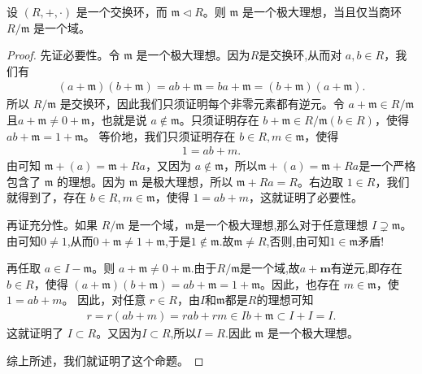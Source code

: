 \documentclass[../../main.tex]{subfiles}
\begin{document}
\begin{proposition}[极大理想的充要条件]\label{proposition:极大理想的充要条件}
设 $(R, +, \cdot)$ 是一个交换环，而 $\mathfrak{m} \lhd R$。则 $\mathfrak{m}$ 是一个极大理想，当且仅当商环 $R / \mathfrak{m}$ 是一个域。
\end{proposition}
\begin{proof}
先证必要性。令 $\mathfrak{m}$ 是一个极大理想。因为$R$是交换环,从而对 $a, b \in R$，我们有
\begin{align*}
(a + \mathfrak{m})(b + \mathfrak{m}) = ab + \mathfrak{m} = ba + \mathfrak{m} = (b + \mathfrak{m})(a + \mathfrak{m}).
\end{align*}
所以 $R / \mathfrak{m}$ 是交换环，因此我们只须证明每个非零元素都有逆元。令 $a + \mathfrak{m} \in R / \mathfrak{m}$且$a + \mathfrak{m} \neq 0 + \mathfrak{m}$，也就是说 $a \notin \mathfrak{m}$。只须证明存在 $b + \mathfrak{m} \in R / \mathfrak{m}(b \in R)$，使得 $ab + \mathfrak{m} = 1 + \mathfrak{m}$。
等价地，我们只须证明存在 $b \in R, m \in \mathfrak{m}$，使得
\begin{align*}
1 = ab + m .
\end{align*}
由可知 $\mathfrak{m}+(a)=\mathfrak{m} + Ra $，又因为 $a \notin \mathfrak{m}$，所以$\mathfrak{m}+(a)=\mathfrak{m} + Ra $是一个严格包含了 $\mathfrak{m}$ 的理想。因为 $\mathfrak{m}$ 是极大理想，所以 $\mathfrak{m} + Ra = R$。右边取 $1 \in R$，我们就得到了，存在 $b \in R,m\in \mathfrak{m}$，使得 $1 = ab + m$，这就证明了必要性。

再证充分性。如果 $R / \mathfrak{m}$ 是一个域，$\mathfrak{m}$是一个极大理想,那么对于任意理想 $I \supsetneq \mathfrak{m}$。由可知$0\ne 1$,从而$0+\mathfrak{m}\ne 1+\mathfrak{m}$,于是$1\notin \mathfrak{m}$.故$\mathfrak{m}\ne R$,否则,由可知$1\in \mathfrak{m}$矛盾!

再任取 $a \in I - \mathfrak{m}$。则 $a + \mathfrak{m} \neq 0 + \mathfrak{m}$.由于$R/\mathfrak{m}$是一个域,故$a+\mathbf{m}$有逆元,即存在 $b \in R$，使得 $(a+\mathfrak{m})(b+\mathfrak{m})=ab + \mathfrak{m} = 1 + \mathfrak{m}$。因此，也存在 $m \in \mathfrak{m}$，使 $1 = ab + m$。
因此，对任意 $r \in R$，由$I$和$\mathfrak{m}$都是$R$的理想可知
\begin{align*}
r = r(ab + m) = rab + rm \in Ib + \mathfrak{m} \subset I + I = I .
\end{align*}
这就证明了 $I\subset R$。又因为$I\subset R$,所以$I=R$.因此 $\mathfrak{m}$ 是一个极大理想。

综上所述，我们就证明了这个命题。 

\end{proof}
\end{document}

